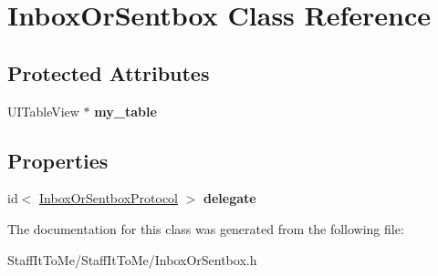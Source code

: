 \hypertarget{interface_inbox_or_sentbox}{
\section{\-Inbox\-Or\-Sentbox \-Class \-Reference}
\label{interface_inbox_or_sentbox}
}
\subsection*{\-Protected \-Attributes}
\begin{DoxyCompactItemize}
\item 
\hypertarget{interface_inbox_or_sentbox_acae3c81d58353a61e95d49f39c68e3b9}{
\-U\-I\-Table\-View $\ast$ {\bfseries my\-\_\-table}}
\label{interface_inbox_or_sentbox_acae3c81d58353a61e95d49f39c68e3b9}

\end{DoxyCompactItemize}
\subsection*{\-Properties}
\begin{DoxyCompactItemize}
\item 
\hypertarget{interface_inbox_or_sentbox_a65f5ac0c3c978f416b6aac7524dbbd38}{
id$<$ \hyperlink{protocol_inbox_or_sentbox_protocol-p}{\-Inbox\-Or\-Sentbox\-Protocol} $>$ {\bfseries delegate}}
\label{interface_inbox_or_sentbox_a65f5ac0c3c978f416b6aac7524dbbd38}

\end{DoxyCompactItemize}


\-The documentation for this class was generated from the following file\-:\begin{DoxyCompactItemize}
\item 
\-Staff\-It\-To\-Me/\-Staff\-It\-To\-Me/\-Inbox\-Or\-Sentbox.\-h\end{DoxyCompactItemize}
